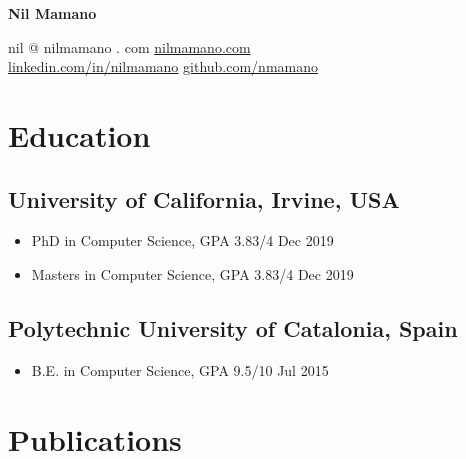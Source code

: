 \documentclass[letterpaper,10pt,oneside]{article}
\begin{document}
\begin{center}
\LARGE{\textbf{Nil Mamano}}\\
\end{center}
\vspace{-2ex}
\hrulefill
\normalsize
\vspace{1em}


\noindent nil @ nilmamano . com \hfill \href{http://www.nilmamano.com}{nilmamano.com} \\
\noindent\href{https://www.linkedin.com/in/nilmamano/}{linkedin.com/in/nilmamano} \hfill \href{https://github.com/nmamano}{github.com/nmamano}  \\ 


\section*{Education}
\subsection*{University of California, Irvine, USA}
\begin{itemize}
    \item PhD in Computer Science, GPA 3.83/4 \hfill Dec 2019
    \item Masters in Computer Science, GPA 3.83/4 \hfill Dec 2019
\end{itemize}
\subsection*{Polytechnic University of Catalonia, Spain}
\begin{itemize}
    \item B.E. in Computer Science, GPA 9.5/10 \hfill Jul 2015
\end{itemize}

\section*{Publications}
\end{document}
